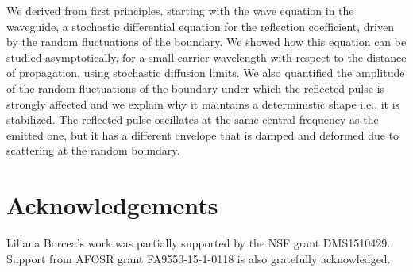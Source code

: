\documentclass[final]{siamltex}
\begin{document}
We derived from first principles, starting with the wave equation in the waveguide, a stochastic differential equation 
for the reflection coefficient, driven by the random fluctuations of the boundary. We showed how
this equation can be studied asymptotically, for a small carrier wavelength with respect to the distance of propagation,
using stochastic diffusion limits. We also quantified the amplitude of the random fluctuations of the 
boundary under which the reflected pulse is strongly affected and we explain why it
maintains a deterministic shape i.e., it is stabilized. The reflected
pulse oscillates at the same central frequency as the emitted one, but it has a different envelope that is 
damped and deformed due to scattering at the random boundary.

\section*{Acknowledgements}
Liliana Borcea's work was partially supported by the NSF grant
DMS1510429. Support from AFOSR grant FA9550-15-1-0118 is also 
gratefully acknowledged.

\appendix
\end{document}
